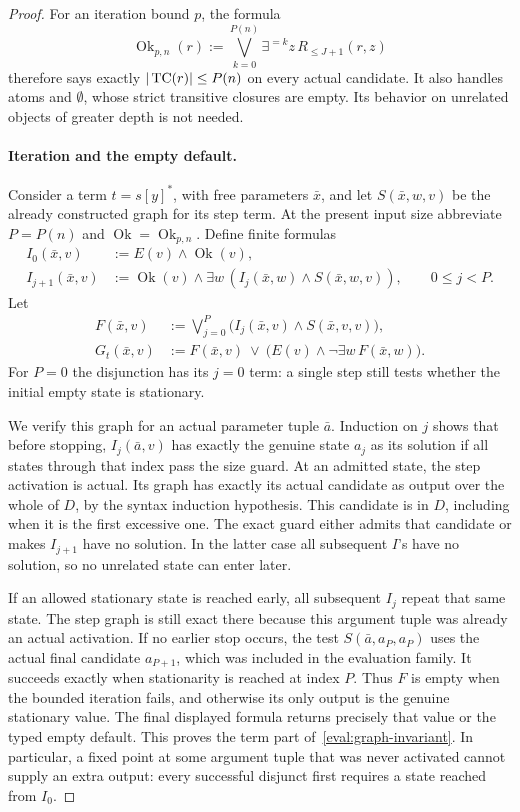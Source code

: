 \begin{proof}
For an iteration bound \(p\), the formula
\[
 \operatorname{Ok}_{p,n}(r):=
       \bigvee_{k=0}^{P(n)}
               \exists^{=k}z\,R_{\le J+1}(r,z)
\]
therefore says exactly \(|\operatorname{TC}(r)|\le P(n)\) on every actual candidate.
It also handles atoms and \(\emptyset\), whose strict transitive closures
are empty.  Its behavior on unrelated objects of greater depth is not
needed.

\paragraph{Iteration and the empty default.}
Consider a term \(t=s[y]^*\), with free parameters \(\bar x\), and let
\(S(\bar x,w,v)\) be the already constructed graph for its step term.
At the present input size abbreviate \(P=P(n)\) and
\(\operatorname{Ok}=\operatorname{Ok}_{p,n}\).  Define finite formulas
\[
 \begin{split}
 I_0(\bar x,v)&:=E(v)\land\operatorname{Ok}(v),\\
 I_{j+1}(\bar x,v)&:=
       \operatorname{Ok}(v)\land
       \exists w\,(I_j(\bar x,w)\land S(\bar x,w,v)),
                  \qquad 0\le j<P.
 \end{split}
\]
Let
\[
 \begin{split}
 F(\bar x,v)&:=
       \bigvee_{j=0}^{P}
                   \bigl(I_j(\bar x,v)\land S(\bar x,v,v)\bigr),\\
 G_t(\bar x,v)&:=
       F(\bar x,v)\ \lor\
        \bigl(E(v)\land\neg\exists w\,F(\bar x,w)\bigr).
 \end{split}
\]
For \(P=0\) the disjunction has its \(j=0\) term: a single step still
tests whether the initial empty state is stationary.

We verify this graph for an actual parameter tuple \(\bar a\).
Induction on \(j\) shows that before stopping, \(I_j(\bar a,v)\)
has exactly the genuine state \(a_j\) as its solution if all states
through that index pass the size guard.  At an admitted state, the step
activation is actual.  Its graph has exactly its actual candidate as
output over the whole of \(D\), by the syntax induction hypothesis.
This candidate is in \(D\), including when it is the first excessive
one.  The exact guard either admits that candidate or makes
\(I_{j+1}\) have no solution.  In the latter case all subsequent \(I\)'s
have no solution, so no unrelated state can enter later.

If an allowed stationary state is reached early, all subsequent \(I_j\)
repeat that same state.  The step graph is still exact there because this
argument tuple was already an actual activation.  If no earlier stop
occurs, the test \(S(\bar a,a_P,a_P)\) uses the actual final candidate
\(a_{P+1}\), which was included in the evaluation family.  It succeeds
exactly when stationarity is reached at index \(P\).
Thus \(F\) is empty when the bounded iteration fails, and otherwise its
only output is the genuine stationary value.  The final displayed
formula returns precisely that value or the typed empty default.
This proves the term part of~\eqref{eval:graph-invariant}.
In particular, a fixed point at some argument tuple that was never
activated cannot supply an extra output: every successful disjunct
first requires a state reached from \(I_0\).


\end{proof}

